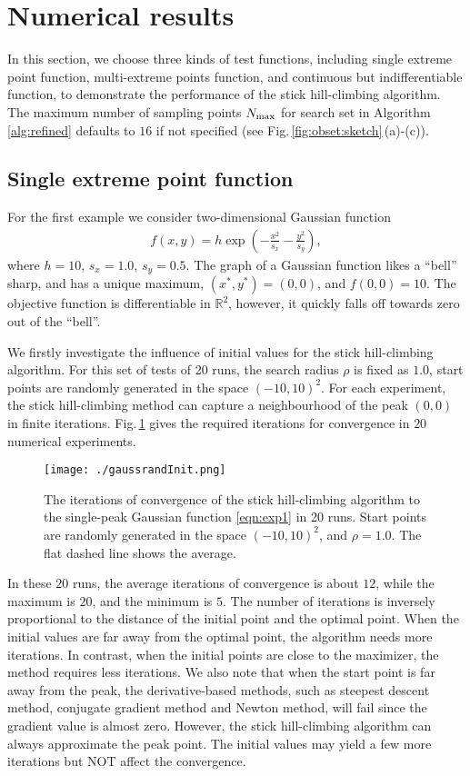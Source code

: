 \documentclass[mathpazo]{aamm}
\newcommand{\Real}{\mathbb{R}}
\begin{document}
\section{Numerical results}
\label{sec:experiment}

In this section, we choose three kinds of test functions,
including single extreme point function, multi-extreme points
function, and continuous but indifferentiable function, 
to demonstrate the performance of the stick hill-climbing algorithm. 
The maximum number of sampling points $N_{\rm{max}}$ for search
set in Algorithm\,\ref{alg:refined} defaults to $16$ if not
specified (see Fig.\,\ref{fig:obset:sketch}\,(a)-(c)).

\subsection{Single extreme point function}
\label{subsec:max1}

For the first example we consider two-dimensional Gaussian function
\begin{align}
	f(x,y) = h\exp\left(-\frac{x^2}{s_x}-\frac{y^2}{s_y}\right),
	\label{eqn:exp1}
\end{align}
where $h=10$, $s_x =1.0$, $s_y = 0.5$.
The graph of a Gaussian function likes a ``bell'' sharp, and has
a unique maximum, $(x^*, y^*)=(0,0)$, and $f(0,0)=10$.
The objective function is differentiable in $\Real^2$, however,
it quickly falls off towards zero out of the ``bell''. 

We firstly investigate the influence of initial values for the
stick hill-climbing algorithm. For this set of tests of 20 runs, 
the search radius $\rho$ is fixed as $1.0$, start points are
randomly generated in the space $(-10, 10)^2$. For each
experiment, the stick hill-climbing method can capture a neighbourhood of the peak
$(0,0)$ in finite iterations. Fig.\,\ref{fig:exp1:randInit} gives
the required iterations for convergence in $20$ numerical experiments.
\begin{figure}[!htbp]
	\centering
	\texttt{[image: ./gaussrandInit.png]}
	  \caption{The iterations of convergence of the stick
	  hill-climbing algorithm to the single-peak Gaussian function
	  \eqref{eqn:exp1} in 20 runs.  Start points are randomly
	  generated in the space $(-10, 10)^2$, and $\rho=1.0$. 
	  The flat dashed line shows the average.} 
	  \label{fig:exp1:randInit}
\end{figure}
In these $20$ runs, the average iterations of convergence is
about $12$, while the maximum is $20$, and the minimum is $5$.
The number of iterations is inversely proportional to the
distance of the initial point and the optimal point.
When the initial values are far away from the optimal point, the
algorithm needs more iterations. In contrast, when the initial
points are close to the maximizer, the method requires less iterations. 
We also note that when the start point is far away from the peak,
the derivative-based methods, such as steepest descent method,
conjugate gradient method and Newton method, will fail since the
gradient value is almost zero. 
However, the stick hill-climbing algorithm can always approximate the
peak point. The initial values may yield a few more iterations
but NOT affect the convergence.
\end{document}

